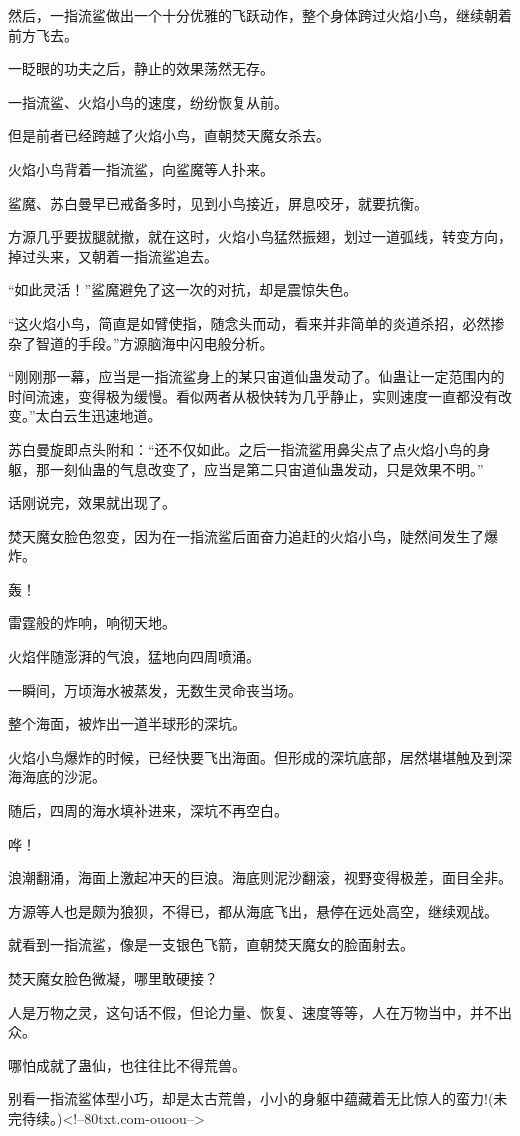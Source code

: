 \begin{this_body}
然后，一指流鲨做出一个十分优雅的飞跃动作，整个身体跨过火焰小鸟，继续朝着前方飞去。

一眨眼的功夫之后，静止的效果荡然无存。

一指流鲨、火焰小鸟的速度，纷纷恢复从前。

但是前者已经跨越了火焰小鸟，直朝焚天魔女杀去。

火焰小鸟背着一指流鲨，向鲨魔等人扑来。

鲨魔、苏白曼早已戒备多时，见到小鸟接近，屏息咬牙，就要抗衡。

方源几乎要拔腿就撤，就在这时，火焰小鸟猛然振翅，划过一道弧线，转变方向，掉过头来，又朝着一指流鲨追去。

“如此灵活！”鲨魔避免了这一次的对抗，却是震惊失色。

“这火焰小鸟，简直是如臂使指，随念头而动，看来并非简单的炎道杀招，必然掺杂了智道的手段。”方源脑海中闪电般分析。

“刚刚那一幕，应当是一指流鲨身上的某只宙道仙蛊发动了。仙蛊让一定范围内的时间流速，变得极为缓慢。看似两者从极快转为几乎静止，实则速度一直都没有改变。”太白云生迅速地道。

苏白曼旋即点头附和：“还不仅如此。之后一指流鲨用鼻尖点了点火焰小鸟的身躯，那一刻仙蛊的气息改变了，应当是第二只宙道仙蛊发动，只是效果不明。”

话刚说完，效果就出现了。

焚天魔女脸色忽变，因为在一指流鲨后面奋力追赶的火焰小鸟，陡然间发生了爆炸。

轰！

雷霆般的炸响，响彻天地。

火焰伴随澎湃的气浪，猛地向四周喷涌。

一瞬间，万顷海水被蒸发，无数生灵命丧当场。

整个海面，被炸出一道半球形的深坑。

火焰小鸟爆炸的时候，已经快要飞出海面。但形成的深坑底部，居然堪堪触及到深海海底的沙泥。

随后，四周的海水填补进来，深坑不再空白。

哗！

浪潮翻涌，海面上激起冲天的巨浪。海底则泥沙翻滚，视野变得极差，面目全非。

方源等人也是颇为狼狈，不得已，都从海底飞出，悬停在远处高空，继续观战。

就看到一指流鲨，像是一支银色飞箭，直朝焚天魔女的脸面射去。

焚天魔女脸色微凝，哪里敢硬接？

人是万物之灵，这句话不假，但论力量、恢复、速度等等，人在万物当中，并不出众。

哪怕成就了蛊仙，也往往比不得荒兽。

别看一指流鲨体型小巧，却是太古荒兽，小小的身躯中蕴藏着无比惊人的蛮力!(未完待续。)<!--80txt.com-ouoou-->

\end{this_body}

